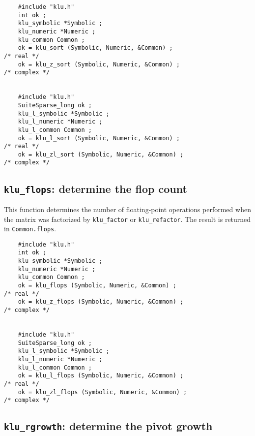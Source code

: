 \documentclass[11pt]{article}
\begin{document}
{\footnotesize
\begin{verbatim}
    #include "klu.h"
    int ok ;
    klu_symbolic *Symbolic ;
    klu_numeric *Numeric ;
    klu_common Common ;
    ok = klu_sort (Symbolic, Numeric, &Common) ;                                      /* real */
    ok = klu_z_sort (Symbolic, Numeric, &Common) ;                                    /* complex */


    #include "klu.h"
    SuiteSparse_long ok ;
    klu_l_symbolic *Symbolic ;
    klu_l_numeric *Numeric ;
    klu_l_common Common ;
    ok = klu_l_sort (Symbolic, Numeric, &Common) ;                                    /* real */
    ok = klu_zl_sort (Symbolic, Numeric, &Common) ;                                   /* complex */
\end{verbatim}
}

\subsection{{\tt klu\_flops}: determine the flop count}

This function determines the number of floating-point operations performed
when the matrix was factorized by {\tt klu\_factor} or {\tt klu\_refactor}.
The result is returned in {\tt Common.flops}.


{\footnotesize
\begin{verbatim}
    #include "klu.h"
    int ok ;
    klu_symbolic *Symbolic ;
    klu_numeric *Numeric ;
    klu_common Common ;
    ok = klu_flops (Symbolic, Numeric, &Common) ;                                     /* real */
    ok = klu_z_flops (Symbolic, Numeric, &Common) ;                                   /* complex */


    #include "klu.h"
    SuiteSparse_long ok ;
    klu_l_symbolic *Symbolic ;
    klu_l_numeric *Numeric ;
    klu_l_common Common ;
    ok = klu_l_flops (Symbolic, Numeric, &Common) ;                                   /* real */
    ok = klu_zl_flops (Symbolic, Numeric, &Common) ;                                  /* complex */
\end{verbatim}
}

\subsection{{\tt klu\_rgrowth}: determine the pivot growth}
\end{document}
